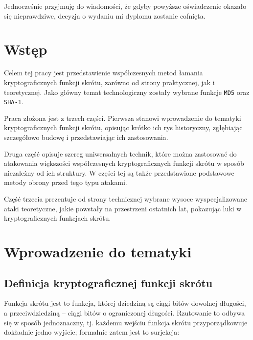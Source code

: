 \documentclass[12pt,a4paper,twoside]{article}
\begin{document}
Jednocześnie przyjmuję do wiadomości, że gdyby powyższe oświadczenie okazało
się nieprawdziwe, decyzja o wydaniu mi dyplomu zostanie cofnięta.


\newpage
\setcounter{tocdepth}{3}
\tableofcontents

\newpage
\pagestyle{fancy}


\section{Wstęp}
Celem tej pracy jest przedstawienie współczesnych metod łamania
kryptograficznych funkcji skrótu, zarówno od strony praktycznej, jak i
teoretycznej. Jako główny temat technologiczny zostały wybrane funkcje
\texttt{MD5} oraz \texttt{SHA-1}.

Praca złożona jest z trzech części. Pierwsza stanowi wprowadzenie do tematyki
kryptograficznych funkcji skrótu, opisując krótko ich rys historyczny,
zgłębiając szczegółowo budowę i przedstawiając ich zastosowania.

Druga część opisuje szereg uniwersalnych technik, które można zastosować do
atakowania większości współczesnych kryptograficznych funkcji skrótu w sposób
niezależny od ich struktury. W części tej są także przedstawione podstawowe
metody obrony przed tego typu atakami.

Część trzecia prezentuje od strony technicznej wybrane wysoce wyspecjalizowane
ataki teoretyczne, jakie powstały na przestrzeni ostatnich lat, pokazując luki
w kryptograficznych funkcjach skrótu.

\newpage



\section{Wprowadzenie do tematyki}

\subsection{Definicja kryptograficznej funkcji skrótu}

Funkcja skrótu jest to funkcja, której dziedziną są ciągi bitów dowolnej
długości, a przeciwdziedziną -- ciągi bitów o ograniczonej długości. Rzutowanie
to odbywa się w sposób jednoznaczny, tj. każdemu wejściu funkcja skrótu
przyporządkowuje dokładnie jedno wyjście; formalnie zatem jest to surjekcja:
\end{document}
